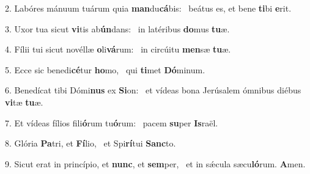 2. Labóres mánuum tuárum quia \textbf{man}du\textbf{cá}bis: \ast\  beátus es, et bene \textbf{ti}bi \textbf{e}rit.\

3. Uxor tua sicut \textbf{vi}tis ab\textbf{ún}dans: \ast\  in latéribus \textbf{do}mus \textbf{tu}æ.\

4. Fílii tui sicut novéllæ \textbf{o}li\textbf{vá}rum: \ast\  in circúitu \textbf{men}sæ \textbf{tu}æ.\

5. Ecce sic benedi\textbf{cé}tur \textbf{ho}mo, \ast\  qui \textbf{ti}met \textbf{Dó}minum.\

6. Benedícat tibi Dómi\textbf{nus} ex \textbf{Si}on: \ast\  et vídeas bona Jerúsalem ómnibus diébus \textbf{vi}tæ \textbf{tu}æ.\

7. Et vídeas fílios fili\textbf{ó}rum tu\textbf{ó}rum: \ast\  pacem \textbf{su}per \textbf{Is}raël.\

8. Glória \textbf{Pa}tri, et \textbf{Fí}lio, \ast\  et Spi\textbf{rí}tui \textbf{Sanc}to.\

9. Sicut erat in princípio, et \textbf{nunc}, et \textbf{sem}per, \ast\  et in sǽcula sæcu\textbf{ló}rum. \textbf{A}men.\

